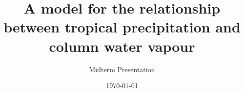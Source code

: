 \title{A model for the relationship between tropical precipitation and column water vapour}
\subtitle{Midterm Presentation}
\date{\today}
\author{\name}
\institute{\course}
